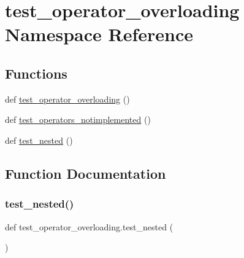 \hypertarget{namespacetest__operator__overloading}{}\section{test\+\_\+operator\+\_\+overloading Namespace Reference}
\label{namespacetest__operator__overloading}
\subsection*{Functions}
\begin{DoxyCompactItemize}
\item 
def \mbox{\hyperlink{namespacetest__operator__overloading_a08295893812b0f0ff016768cad3ae8ff}{test\+\_\+operator\+\_\+overloading}} ()
\item 
def \mbox{\hyperlink{namespacetest__operator__overloading_a8ca2e81a0850d393fc049239f6213e12}{test\+\_\+operators\+\_\+notimplemented}} ()
\item 
def \mbox{\hyperlink{namespacetest__operator__overloading_a77ef2177f4cdcaa9d7bd46991a09bd4a}{test\+\_\+nested}} ()
\end{DoxyCompactItemize}


\subsection{Function Documentation}
\mbox{\label{namespacetest__operator__overloading_a77ef2177f4cdcaa9d7bd46991a09bd4a}} 
\subsubsection{\texorpdfstring{test\_nested()}{test\_nested()}}
{\footnotesize\ttfamily def test\+\_\+operator\+\_\+overloading.\+test\+\_\+nested (\begin{DoxyParamCaption}{ }\end{DoxyParamCaption})}

 \mbox{\label{namespacetest__operator__overloading_a08295893812b0f0ff016768cad3ae8ff}} 
